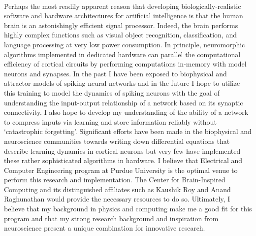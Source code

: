 \documentclass{article}
\begin{document}
\\
\indent Perhaps the most readily apparent reason that developing biologically-realistic software and hardware architectures for artificial intelligence is that the human brain is an astonishingly efficient signal processor. Indeed, the brain performs highly complex functions such as visual object recognition, classification, and language processing at very low power consumption. In principle, neuromorphic algorithms implemented in dedicated hardware can parallel the computational efficiency of cortical circuits by performing computations in-memory with model neurons and synapses. In the past I have been exposed to biophysical and attractor models of spiking neural networks and in the future I hope to utilize this training to model the dynamics of spiking neurons with the goal of  understanding the input-output relationship of a network based on its synaptic connectivity. I also hope to develop my understanding of the ability of a network to compress inputs via learning and store information reliably without `catastrophic forgetting'. Significant efforts have been made in the biophysical and neuroscience communities towards writing down differential equations that describe learning dynamics in cortical neurons but very few have implemented these rather sophisticated algorithms in hardware. I believe that Electrical and Computer Engineering program at Purdue University is the optimal venue to perform this research and implementation. The Center for Brain-Inspired Computing and its distinguished affiliates such as Kaushik Roy and Anand Raghunathan would provide the necessary resources to do so. Ultimately, I believe that my background in physics and computing make me a good fit for this program and that my strong research background and inspiration from neuroscience present a unique combination for innovative research.\\
\end{document}
